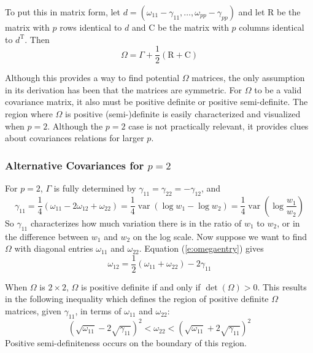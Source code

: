 \documentclass[12pt]{article}
\newcommand{\var}{\operatorname{var}}
\begin{document}
To put this in matrix form, let $d = (\omega_{11} - \gamma_{11}, \dots, \omega_{pp} - \gamma_{pp})$ and let $\mathrm{R}$ be the matrix with $p$ rows identical to $d$ and $\mathrm{C}$ be the matrix with $p$ columns identical to $d^\mathrm{T}$. Then
\begin{equation}
\label{e:omegamatrix}
\Omega = \Gamma + \frac{1}{2}(\mathrm{R} + \mathrm{C})
\end{equation}

Although this provides a way to find potential $\Omega$ matrices, the only assumption in its derivation has been that the matrices are symmetric. For $\Omega$ to be a valid covariance matrix, it also must be positive definite or positive semi-definite. The region where $\Omega$ is positive (semi-)definite is easily characterized and visualized when $p = 2$. Although the $p = 2$ case is not practically relevant, it provides clues about covariances relations for larger $p$.

\subsubsection*{Alternative Covariances for $p=2$}

For $p = 2$, $\Gamma$ is fully determined by $\gamma_{11} = \gamma_{22} = -\gamma_{12}$, and
\begin{equation}
\gamma_{11} = \frac{1}{4}(\omega_{11} - 2\omega_{12} + \omega_{22}) = \frac{1}{4}\var(\log w_1 - \log w_2) = \frac{1}{4} \var\left( \log \frac{w_1}{w_2} \right)
\end{equation}
So $\gamma_{11}$ characterizes how much variation there is in the ratio of $w_1$ to $w_2$, or in the difference between $w_1$ and $w_2$ on the log scale. Now suppose we want to find $\Omega$ with diagonal entries $\omega_{11}$ and $\omega_{22}$. Equation (\ref{e:omegaentry}) gives
\begin{equation}
\label{e:sig12}
\omega_{12} = \frac{1}{2}(\omega_{11} + \omega_{22}) - 2\gamma_{11}
\end{equation}

When $\Omega$ is $2 \times 2$, $\Omega$ is positive definite if and only if $\det(\Omega) > 0$. This results in the following inequality which defines the region of positive definite $\Omega$ matrices, given $\gamma_{11}$, in terms of $\omega_{11}$ and $\omega_{22}$:
\begin{equation}
\left( \sqrt{\omega_{11}} - 2\sqrt{\gamma_{11}} \right)^2 < \omega_{22} < \left( \sqrt{\omega_{11}} + 2\sqrt{\gamma_{11}} \right)^2
\end{equation}
Positive semi-definiteness occurs on the boundary of this region.
\end{document}
